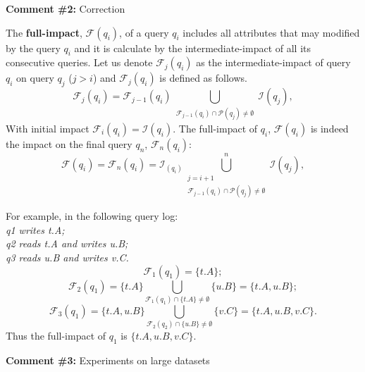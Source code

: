 

\comskip

\noindent
\textbf{Comment \#2:} Correction
\begin{quote}
\end{quote}



The \textbf{full-impact}, $\mathcal{F}(q_i)$, of a query $q_i$ includes all
attributes that may modified by the query $q_i$ and it is calculate by the
intermediate-impact of all its consecutive queries. Let us denote
$\mathcal{F}_j(q_i)$ as the intermediate-impact of query $q_i$ on query $q_j$
($j > i$) and $\mathcal{F}_j(q_i)$ is defined as follows. \[
\mathcal{F}_j(q_i)=\mathcal{F}_{j-1}(q_i)\bigcup_{\substack{\mathcal{F}_{j-1}(q_i)\cap
\mathcal{P}(q_j) \neq \emptyset}} \mathcal{I}(q_j), \] With initial impact
$\mathcal{F}_i(q_i) = \mathcal{I}(q_i)$. The full-impact of $q_i$,
$\mathcal{F}(q_i)$ is indeed the impact on the final query $q_n$,
$\mathcal{F}_n(q_i)$: \[ \mathcal{F}(q_i)=\mathcal{F}_n(q_i) =
\mathcal{I}_(q_i)\bigcup_{\substack{j = i+1 \\ \mathcal{F}_{j-1}(q_i)\cap
\mathcal{P}(q_j) \neq \emptyset}}^n \mathcal{I}(q_j), \]

For example, in the following query log:\\
\textit{q1 writes t.A; \\
q2 reads t.A and writes u.B; \\
q3 reads u.B and writes v.C.}\\
\[\mathcal{F}_1(q_1) = \{t.A\};\] 
\[\mathcal{F}_2(q_1) = \{t.A\} \bigcup_{\mathcal{F}_1(q_1) \cap \{t.A\} \neq \emptyset} \{u.B\} = \{t.A, u.B\};\]
\[\mathcal{F}_3(q_1) = \{t.A, u.B\}\bigcup_{\mathcal{F}_2(q_2) \cap \{u.B\} \neq \emptyset} \{v.C\} = \{t.A, u.B, v.C\}.\]
Thus the full-impact of $q_1$ is $\{t.A, u.B, v.C\}$.




\comskip

\noindent
\textbf{Comment \#3:} Experiments on large datasets
\begin{quote}
\end{quote}

